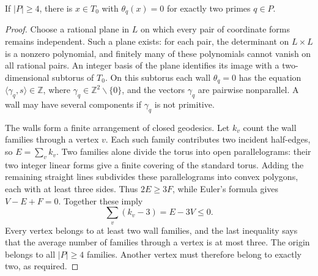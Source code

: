 \begin{remark}\label{long269:res:dp-two-walls}
If $|P|\ge4$, there is $x\in T_0$ with $\theta_q(x)=0$ for exactly two
primes $q\in P$.
\end{remark}
\begin{proof}
Choose a rational plane in $L$ on which every pair of coordinate forms
remains independent. Such a plane exists: for each pair, the determinant
on $L\times L$ is a nonzero polynomial, and finitely many of these
polynomials cannot vanish on all rational pairs. An integer basis of the
plane identifies its image with a two-dimensional subtorus of $T_0$.
On this subtorus each wall $\theta_q=0$ has the equation
$\langle\gamma_q,s\rangle\in\mathbb Z$, where
$\gamma_q\in\mathbb Z^2\smallsetminus\{0\}$, and the vectors $\gamma_q$ are
pairwise nonparallel. A wall may have several components if $\gamma_q$
is not primitive.

The walls form a finite arrangement of closed geodesics. Let $k_v$ count
the wall families through a vertex $v$. Each such family contributes two
incident half-edges, so $E=\sum_v k_v$. Two families alone divide the torus
into open parallelograms: their two integer linear forms give a finite
covering of the standard torus. Adding the remaining straight lines
subdivides these parallelograms into convex polygons, each with at least
three sides. Thus $2E\ge3F$, while Euler's formula gives $V-E+F=0$.
Together these imply
\[
 \sum_v(k_v-3)=E-3V\le0.
\]
Every vertex belongs to at least two wall families, and the last
inequality says that the average number of families through a vertex is
at most three. The origin belongs to all $|P|\ge4$ families. Another
vertex must therefore belong to exactly two, as required.
\end{proof}

